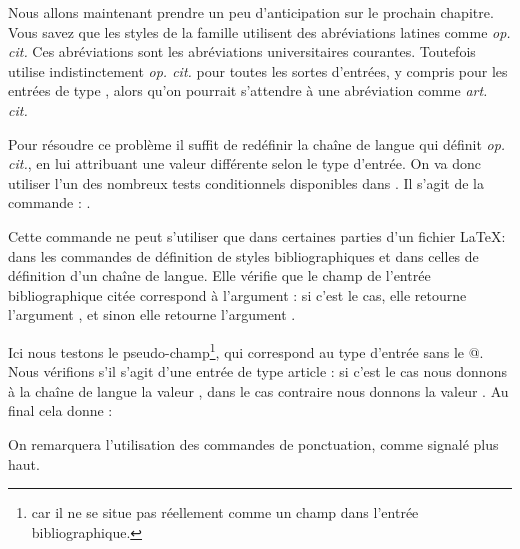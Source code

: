 Nous allons maintenant prendre un peu d'anticipation sur le prochain chapitre.
Vous savez  que les styles de la famille  utilisent des abréviations latines comme \emph{op. cit.}
Ces abréviations sont les abréviations universitaires courantes. Toutefois    utilise indistinctement \emph{op. cit.} pour toutes les sortes d'entrées, y compris pour les entrées de type , alors qu'on pourrait s'attendre à une abréviation comme \emph{art. cit.}

Pour résoudre ce problème il suffit de redéfinir la chaîne de langue qui définit \emph{op. cit.}, en lui attribuant une valeur différente selon le type d'entrée.  On va donc utiliser l'un des nombreux tests conditionnels disponibles dans . 
Il s'agit de la commande : .

Cette commande ne peut s'utiliser que dans certaines parties d'un fichier \LaTeX : dans les commandes de définition de styles bibliographiques et  dans celles de définition d'un chaîne de langue. 
Elle vérifie que le champ     de l'entrée bibliographique citée correspond à l'argument : si c'est le cas, elle retourne l'argument , et sinon elle retourne l'argument .

Ici nous testons le pseudo-champ\footnote{ car il ne se situe pas réellement comme un champ dans l'entrée bibliographique.}, qui correspond au type d'entrée sans le @. Nous vérifions  s'il s'agit d'une entrée de type article : si c'est le cas nous donnons à la chaîne de langue la valeur  ,  dans le cas contraire nous donnons la valeur .
Au final cela donne : 

\begin{latexcode}
\end{latexcode}


On remarquera l'utilisation des commandes de ponctuation, comme signalé plus haut.



    
